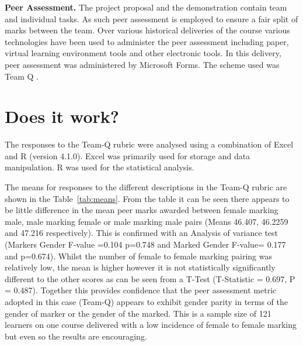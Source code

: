 \documentclass[sigconf, anonymous=true]{acmart}
\begin{document}
\textbf{Peer Assessment.}
The project proposal and the demonstration contain team and individual tasks. As such peer assessment is employed to ensure a fair split of marks between the team. Over various historical deliveries of the course various technologies have been used to administer the peer assessment including paper, virtual learning environment tools and other electronic tools. In this delivery, peer assessment was administered by Microsoft Forms. The scheme used was Team Q \cite{Britton2017}.
\section{Does it work?}	
The responses to the Team-Q rubric were analysed using a combination of Excel and R (version 4.1.0). Excel was primarily used for storage and data manipulation. R was used for the statistical analysis. 

The means for responses to the different descriptions in the Team-Q rubric are shown in the Table~\ref{tab:means}. From the table it can be seen there appears to be little difference in the mean peer marks awarded between female marking male, male marking female or male marking male pairs (Means 46.407, 46.2259 and 47.216 respectively). This is confirmed with an Analysis of variance test (Markers Gender F-value =0.104 p=0.748 and Marked Gender F-value= 0.177 and p=0.674). Whilst the number of female to female marking pairing was relatively low, the mean is higher however it is not statistically significantly different to the other scores as can be seen from a T-Test (T-Statistic = 0.697, P = 0.487). Together this provides confidence that the peer assessment metric adopted in this case (Team-Q) appears to exhibit gender parity in terms of the gender of marker or the gender of the marked. This is a sample size of 121 learners on one course delivered with a low incidence of female to female marking but even so the results are encouraging.
\end{document}
